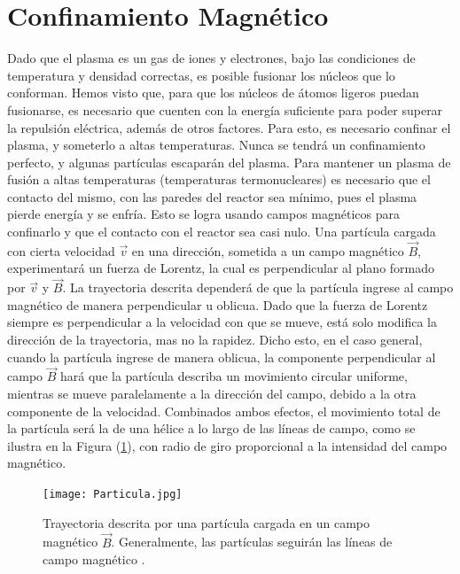 \documentclass[../main.tex]{subfiles}
\begin{document}
\section{Confinamiento Magnético}
	Dado que el plasma es un gas de iones y electrones, bajo las condiciones de temperatura y densidad correctas, es posible fusionar los núcleos que lo conforman. Hemos visto que, para que los núcleos de átomos ligeros puedan fusionarse, es necesario que cuenten con la energía suficiente para poder superar la repulsión eléctrica, además de otros factores. Para esto, es necesario confinar el plasma, y someterlo a altas temperaturas. Nunca se tendrá un confinamiento perfecto, y algunas partículas escaparán del plasma. Para mantener un plasma de fusión a altas temperaturas (temperaturas termonucleares) es necesario que el contacto del mismo, con las paredes del reactor sea mínimo, pues el plasma pierde energía y se enfría. Esto se logra usando campos magnéticos para confinarlo y que el contacto
    con el reactor sea casi nulo. Una partícula cargada con cierta velocidad $\vec v$ en una dirección, sometida a un campo magnético $\vec B$, experimentará un fuerza de Lorentz, la cual
    es perpendicular al plano formado por $\vec v$ y $\vec B$. La trayectoria descrita dependerá de que la partícula ingrese al campo magnético de manera perpendicular u oblicua.
    Dado que la fuerza de Lorentz siempre es perpendicular a la velocidad con que se mueve, está solo modifica la dirección de la trayectoria, mas no la rapidez. Dicho esto, en el caso general, cuando la partícula ingrese de manera oblicua, la componente perpendicular al campo $\vec B$ hará que la partícula describa un movimiento circular uniforme, mientras se mueve paralelamente a la dirección del campo, debido a la otra componente de la velocidad. Combinados ambos efectos, el movimiento total de la partícula será la de una hélice a lo largo de las líneas de campo, como se ilustra en la Figura (\ref{fig:trayectoria}), con radio de giro proporcional a la intensidad del campo magnético. \\
     
        \begin{figure}
        \texttt{[image: Particula.jpg]}
        \caption{Trayectoria descrita por una partícula cargada en un campo magnético $\vec{B}$. Generalmente, las partículas seguirán las líneas de campo magnético \cite{stacey2010fusion}.}
        \label{fig:trayectoria}
        \end{figure}
\end{document}
